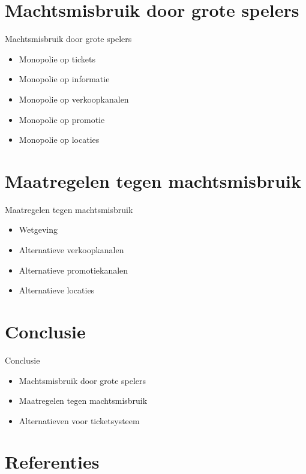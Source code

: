 \documentclass{beamer}
\begin{document}
\section{Machtsmisbruik door grote spelers}
\begin{frame}{Machtsmisbruik door grote spelers}
    \begin{itemize}
        \item Monopolie op tickets
        \item Monopolie op informatie
        \item Monopolie op verkoopkanalen
        \item Monopolie op promotie
        \item Monopolie op locaties
    \end{itemize}
\end{frame}
    
\section{Maatregelen tegen machtsmisbruik}
\begin{frame}{Maatregelen tegen machtsmisbruik}
    \begin{itemize}
        \item Wetgeving
        \item Alternatieve verkoopkanalen
        \item Alternatieve promotiekanalen
        \item Alternatieve locaties
    \end{itemize}
\end{frame}
    
\section{Conclusie}
\begin{frame}{Conclusie}
    \begin{itemize}
        \item Machtsmisbruik door grote spelers
        \item Maatregelen tegen machtsmisbruik
        \item Alternatieven voor ticketsysteem
    \end{itemize}
\end{frame}
    
\section{Referenties}
\end{document}
